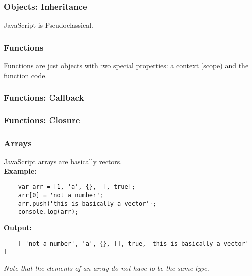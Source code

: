 \documentclass{lug}
\begin{document}
\begin{frame}
    \frametitle{Objects: Inheritance}
    JavaScript is Pseudoclassical.


\end{frame}


\begin{frame}
    \frametitle{Functions}

    Functions are just objects with two special properties: a context (scope) and the function code.

\end{frame}

\begin{frame}
    \frametitle{Functions: Callback}
\end{frame}

\begin{frame}
    \frametitle{Functions: Closure}

\end{frame}

\begin{frame}[fragile]
    \frametitle{Arrays}

    JavaScript arrays are basically vectors.\\

    \textbf{Example:}

    \begin{lstlisting}
    var arr = [1, 'a', {}, [], true];
    arr[0] = 'not a number';
    arr.push('this is basically a vector');
    console.log(arr);
    \end{lstlisting}

    \textbf{Output:}

    \begin{lstlisting}
    [ 'not a number', 'a', {}, [], true, 'this is basically a vector' ]
    \end{lstlisting}

    \textit{Note that the elements of an array do not have to be the same type.}

\end{frame}
\end{document}
